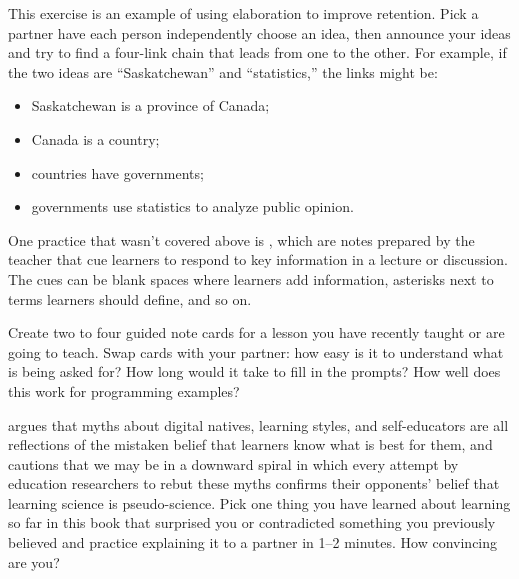 
This exercise is an example of using elaboration to improve retention.
Pick a partner
have each person independently choose an idea,
then announce your ideas and try to find a four-link chain
that leads from one to the other.
For example,
if the two ideas are ``Saskatchewan'' and ``statistics,''
the links might be:

\begin{itemize}

\item
  Saskatchewan is a province of Canada;

\item
  Canada is a country;

\item
  countries have governments;

\item
  governments use statistics to analyze public opinion.

\end{itemize}


One practice that wasn't covered above is ,
which are notes prepared by the teacher
that cue learners to respond to key information in a lecture or discussion.
The cues can be blank spaces where learners add information,
asterisks next to terms learners should define,
and so on.

Create two to four guided note cards for a lesson you have recently taught
or are going to teach.
Swap cards with your partner:
how easy is it to understand what is being asked for?
How long would it take to fill in the prompts?
How well does this work for programming examples?


\cite{Kirs2013} argues that myths about digital natives,
learning styles,
and self-educators are all reflections of the mistaken belief that
learners know what is best for them,
and cautions that we may be in a downward spiral
in which every attempt by education researchers to rebut these myths
confirms their opponents' belief that learning science is pseudo-science.
Pick one thing you have learned about learning so far in this book
that surprised you or contradicted something you previously believed
and practice explaining it to a partner in 1--2 minutes.
How convincing are you?


